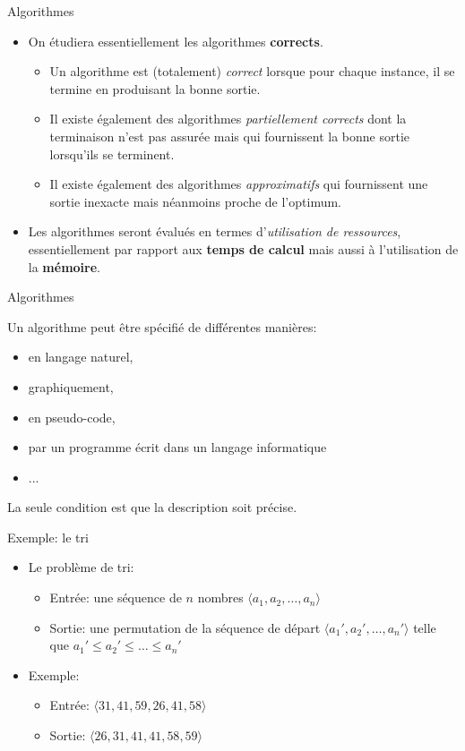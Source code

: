 \begin{frame}{Algorithmes}
\begin{itemize}
\item On étudiera essentiellement les algorithmes {\bf corrects}.
\begin{itemize}
\item Un algorithme est (totalement) {\em correct} lorsque pour chaque instance, il se termine en produisant la bonne sortie.
\item Il existe également des algorithmes {\em partiellement corrects} dont la terminaison n'est pas assurée mais qui fournissent la bonne sortie lorsqu'ils se terminent.
\item Il existe également des algorithmes {\em approximatifs} qui fournissent une sortie inexacte mais néanmoins proche de l'optimum.
\end{itemize}
\bigskip
\item Les algorithmes seront évalués en termes d'{\em utilisation de ressources}, essentiellement par rapport aux {\bf temps de calcul} mais aussi à l'utilisation de la {\bf mémoire}.
\end{itemize}
\end{frame}

\begin{frame}{Algorithmes}

Un algorithme peut être spécifié de différentes manières:
\begin{itemize}
\item en langage naturel,
\item graphiquement,
\item en pseudo-code,
\item par un programme écrit dans un langage informatique
\item ...
\end{itemize}
La seule condition est que la description soit précise.

\end{frame}


\begin{frame}{Exemple: le tri}
\begin{itemize}
\item Le problème de tri:
\begin{itemize}
\item Entrée: une séquence de $n$ nombres $\langle a_1,a_2,\ldots,a_n\rangle$
\item Sortie: une permutation de la séquence de départ $\langle a_1',a_2',\ldots,a_n'\rangle$ telle que $a_1'\leq a_2'\leq\ldots\leq a_n'$
\end{itemize}
\bigskip
\item Exemple:
\begin{itemize}
\item Entrée: $\langle 31,41,59,26,41,58\rangle$
\item Sortie: $\langle 26,31,41,41,58,59\rangle$
\end{itemize}
\end{itemize}

\end{frame}

